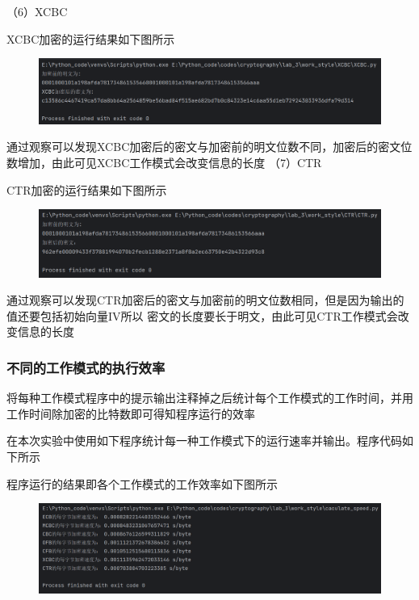\documentclass[a4paper,11pt,UTF8]{ctexart}
\newcommand{\bottomcaption}{%
\setlength{\abovecaptionskip}{6pt}%
\setlength{\belowcaptionskip}{6pt}%
\caption}
\newcommand{\xiaowuhao}{\fontsize{9pt}{\baselineskip}\selectfont}   %
\begin{document}
            （6）XCBC\par
                XCBC加密的运行结果如下图所示
                \begin{figure}[H]
                    \centering
                    \includegraphics[width=13cm]{XCBC_result_4.png}
                    \bottomcaption{\xiaowuhao{XCBC加密结果}}
                \end{figure}
                通过观察可以发现XCBC加密后的密文与加密前的明文位数不同，加密后的密文位数增加，由此可见XCBC工作模式会改变信息的长度
\newpage
            （7）CTR\par
                CTR加密的运行结果如下图所示
                \begin{figure}[H]
                    \centering
                    \includegraphics[width=13cm]{CTR_result_4.png}
                    \bottomcaption{\xiaowuhao{CTR加密结果}}
                \end{figure}
                通过观察可以发现CTR加密后的密文与加密前的明文位数相同，但是因为输出的值还要包括初始向量IV所以
                密文的长度要长于明文，由此可见CTR工作模式会改变信息的长度

        \subsubsection{不同的工作模式的执行效率}
            将每种工作模式程序中的提示输出注释掉之后统计每个工作模式的工作时间，并用工作时间除加密的比特数即可得知程序运行的效率\par
            在本次实验中使用如下程序统计每一种工作模式下的运行速率并输出。程序代码如下所示
            
            程序运行的结果即各个工作模式的工作效率如下图所示
            \begin{figure}[H]
                \centering
                \includegraphics[width=13cm]{speed.png}
                \bottomcaption{\xiaowuhao{所有工作模式运行效率}}
            \end{figure}
\end{document}
